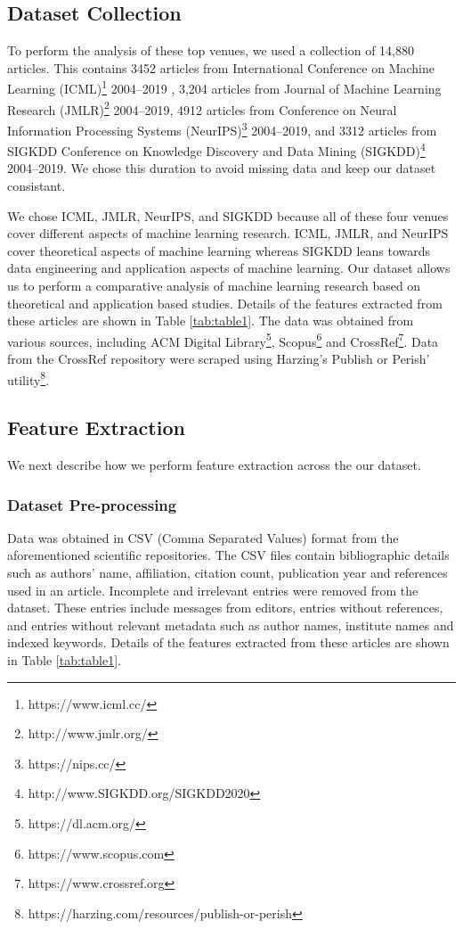 \subsection{Dataset Collection}

To perform the analysis of these top venues, we used a collection of 14,880 articles. This contains 3452 articles from International Conference on Machine Learning (ICML)\footnote{https://www.icml.cc/} 2004--2019 
, 3,204 articles from Journal of Machine Learning Research (JMLR)\footnote{http://www.jmlr.org/} 2004--2019, 4912 articles from Conference on Neural Information Processing Systems (NeurIPS)\footnote{https://nips.cc/} 2004--2019, and 3312 articles from SIGKDD Conference on Knowledge Discovery and Data Mining (SIGKDD)\footnote{http://www.SIGKDD.org/SIGKDD2020} 2004--2019. We chose this duration to avoid missing data and keep our dataset consistant.

We chose ICML, JMLR, NeurIPS, and SIGKDD because all of these four venues cover different aspects of machine learning research. ICML, JMLR, and NeurIPS cover theoretical aspects of machine learning whereas SIGKDD leans towards data engineering and application aspects of machine learning. Our dataset allows us to perform a comparative analysis of machine learning research based on theoretical and application based studies. Details of the features extracted from these articles are shown in Table \ref{tab:table1}. The data was obtained from various sources, including ACM Digital Library\footnote{https://dl.acm.org/}, Scopus\footnote{https://www.scopus.com} and CrossRef\footnote{https://www.crossref.org}. Data from the CrossRef repository were scraped using Harzing's Publish or Perish' utility\footnote{https://harzing.com/resources/publish-or-perish}.


\subsection{Feature Extraction}

We next describe how we perform feature extraction across the our dataset.

\subsubsection{Dataset Pre-processing}

Data was obtained in CSV (Comma Separated Values) format from the aforementioned scientific repositories. The CSV files contain bibliographic details such as authors' name, affiliation, citation count, publication year and references used in an article. Incomplete and irrelevant entries were removed from the dataset. These entries include messages from editors, entries without references, and entries without relevant metadata such as author names, institute names and indexed keywords. Details of the features extracted from these articles are shown in Table \ref{tab:table1}.

